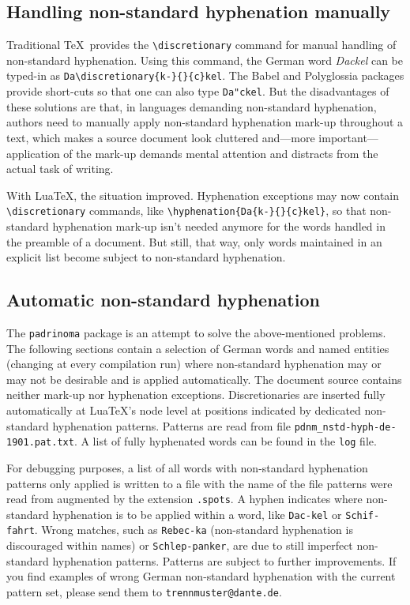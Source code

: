 \documentclass{article}
\begin{document}
\subsection{Handling non-standard hyphenation manually}

Traditional \TeX\ provides the \verb+\discretionary+ command for manual
handling of non-standard hyphenation.  Using this command, the German
word \emph{Dackel} can be typed-in as
\verb+Da\discretionary{k-}{}{c}kel+.  The Babel and Polyglossia packages
provide short-cuts so that one can also type \verb+Da"ckel+.  But the
disadvantages of these solutions are that, in languages demanding
non-standard hyphenation, authors need to manually apply non-standard
hyphenation mark-up throughout a text, which makes a source document
look cluttered and---more important---application of the mark-up demands
mental attention and distracts from the actual task of writing.

With Lua\TeX, the situation improved.  Hyphenation exceptions may now
contain \verb+\discretionary+ commands, like
\verb+\hyphenation{Da{k-}{}{c}kel}+, so that non-standard hyphenation
mark-up isn't needed anymore for the words handled in the preamble of a
document.  But still, that way, only words maintained in an explicit
list become subject to non-standard hyphenation.

\subsection{Automatic non-standard hyphenation}

The \texttt{padrinoma} package is an attempt to solve the
above-mentioned problems.  The following sections contain a selection of
German words and named entities (changing at every compilation run)
where non-standard hyphenation may or may not be desirable and is
applied automatically.  The document source contains neither mark-up nor
hyphenation exceptions.  Discretionaries are inserted fully
automatically at Lua\TeX's node level at positions indicated by
dedicated non-standard hyphenation patterns.  Patterns are read from
file \verb+pdnm_nstd-hyph-de-1901.pat.txt+.  A list of fully hyphenated
words can be found in the \verb+log+ file.

For debugging purposes, a list of all words with non-standard
hyphenation patterns only applied is written to a file with the name of
the file patterns were read from augmented by the extension
\verb+.spots+.  A hyphen indicates where non-standard hyphenation is to
be applied within a word, like \verb+Dac-kel+ or \verb+Schif-fahrt+.
Wrong matches, such as \verb+Rebec-ka+ (non-standard hyphenation is
discouraged within names) or \verb+Schlep-panker+, are due to still
imperfect non-standard hyphenation patterns.  Patterns are subject to
further improvements.  If you find examples of wrong German non-standard
hyphenation with the current pattern set, please send them to
\verb+trennmuster@dante.de+.
\end{document}
